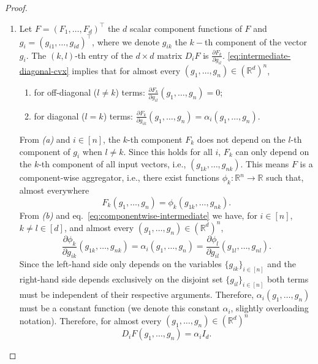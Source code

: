 \documentclass[twoside,11pt]{article}
\newcommand{\R}{\mathbb{R}}
\begin{document}
\begin{proof}
\begin{enumerate}
        \item[\textit{(ii)}]
        Let $F = (F_1, \ldots, F_d)^\intercal$ the $d$ scalar component functions of $F$ and $g_i = (g_{i1}, \ldots, g_{id})^\intercal$, where we denote $g_{ik}$ the $k-$th component of the vector $g_i$. 
        The $(k, l)$-th entry of the $d \times d$ matrix $D_i F$ is $\frac{\partial F_k}{\partial g_{il}}$. 
        \eqref{eq:intermediate-diagonal-cvx} implies that for almost every $(g_1, \ldots, g_n) \in (\R^d)^n$,
        \begin{enumerate}
            \item[\textit{(a)}] for off-diagonal ($l \neq k$) terms: $\frac{\partial F_k}{\partial g_{il}}(g_1, \ldots, g_n) = 0$;
            \item[\textit{(b)}] for diagonal ($l = k$) terms: $\frac{\partial F_k}{\partial g_{ik}}(g_1, \ldots, g_n) = \alpha_i(g_1, \ldots, g_n)$.
        \end{enumerate}
        From \textit{(a)} and $i \in [n]$, the $k$-th component $F_k$ does not depend on the $l$-th component of $g_i$ when $l \neq k$. 
        Since this holds for all $i$, $F_k$ can only depend on the $k$-th component of all input vectors, i.e., $(g_{1k}, \ldots, g_{nk})$.
        This means $F$ is a component-wise aggregator, i.e., there exist functions $\phi_k: \R^n \to \R$ such that, almost everywhere
        \begin{equation}\label{eq:componentwise-intermediate}
            F_k(g_1, \ldots, g_n) = \phi_k(g_{1k}, \ldots, g_{nk}).
        \end{equation}
        From \textit{(b)} and eq.~\ref{eq:componentwise-intermediate} we have, for $i \in [n]$, $k \neq l \in [d]$, and almost every $(g_1, \ldots, g_n) \in (\R^d)^n$,
        \[
            \frac{\partial \phi_k}{\partial g_{ik}}(g_{1k}, \ldots, g_{nk}) 
            = \alpha_i(g_1, \ldots, g_n)
            =  \frac{\partial \phi_l}{\partial g_{il}}(g_{1l}, \ldots, g_{nl}).
        \]
        Since the left-hand side only depends on the variables $\{ g_{ik} \}_{i\in[n]}$ and the right-hand side depends exclusively on the disjoint set $\{ g_{il} \}_{i\in[n]}$ both terms must be independent of their respective arguments. 
        Therefore, $\alpha_i(g_1, \ldots, g_n)$ must be a constant function (we denote this constant $\alpha_i$, slightly overloading notation).
        Therefore, for almost every $(g_1, \ldots, g_n) \in (\R^d)^n$
        \begin{equation}\label{eq:jacobians-constant-a.e.}
            D_i F(g_1, \ldots, g_n) = \alpha_i I_d. 
        \end{equation}
        

\end{enumerate}
\end{proof}
\end{document}
